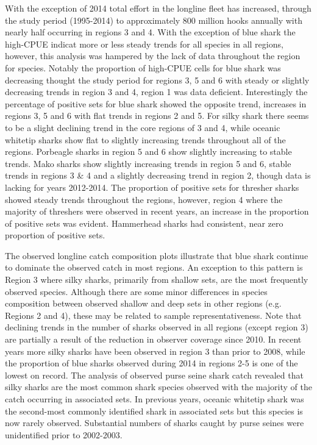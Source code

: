 \documentclass[12pt]{SCreport}
\begin{document}
With the exception of 2014 total effort in the longline fleet has increased, through the study period (1995-2014) to approximately 800 million hooks annually with nearly half occurring in regions 3 and 4. With the exception of blue shark the high-CPUE indicat more or less steady trends for all species in all regions, however, this analysis was hampered by the lack of data throughout the region for species. Notably the proportion of high-CPUE cells for blue shark was decreasing thought the study period for regions 3, 5 and 6 with steady or slightly decreasing trends in region 3 and 4, region 1 was data deficient. Interestingly the percentage of positive sets for blue shark showed the opposite trend, increases in regions 3, 5 and 6 with flat trends in regions 2 and 5. For silky shark there seems to be a slight declining trend in the core regions of 3 and 4, while oceanic whitetip sharks show flat to slightly increasing trends throughout all of the regions. Porbeagle sharks in region 5 and 6 show slightly increasing to stable trends. Mako sharks show slightly increasing trends in region 5 and 6, stable trends in regions 3 & 4 and a slightly decreasing trend in region 2, though data is lacking for years 2012-2014. The proportion of positive sets for thresher sharks showed steady trends throughout the regions, however, region 4 where the majority of threshers were observed in recent years, an increase in the proportion of positive sets was evident. Hammerhead sharks had consistent, near zero proportion of positive sets. 

The observed longline catch composition plots illustrate that blue shark continue to dominate the observed catch in most regions. An exception to this pattern is Region 3 where silky sharks, primarily from shallow sets, are the most frequently observed species. Although there are some minor differences in species composition between observed shallow and deep sets in other regions (e.g. Regions 2 and 4), these may be related to sample representativeness. Note that declining trends in the number of sharks observed in all regions (except region 3) are partially a result of the reduction in observer coverage since 2010. In recent years more silky sharks have been observed in region 3 than prior to 2008, while the proportion of blue sharks observed during 2014 in regions 2-5 is one of the lowest on record. The analysis of observed purse seine shark catch revealed that silky sharks are the most common shark species observed with the majority of the catch occurring in associated sets. In previous years, oceanic whitetip shark was the second-most commonly identified shark in associated sets but this species is now rarely observed. Substantial numbers of sharks caught by purse seines were unidentified prior to 2002-2003.
\end{document}
